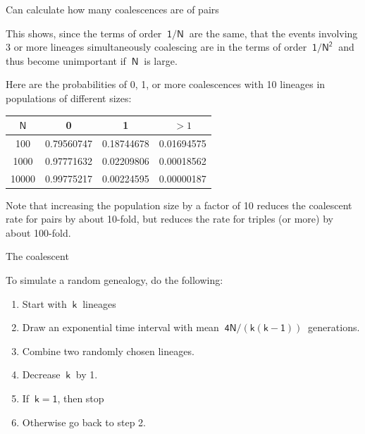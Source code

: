 \documentclass[bluish,slideColor,colorBG,pdf]{prosper}
\begin{document}
\begin{slide}[Replace]{Can calculate how many coalescences are of pairs}
\bigskip

This shows, since the terms of order $\mathsf{~1/N~}$ are the same,
that the events involving 3 or more lineages simultaneously
coalescing are in the terms of order $~\mathsf{1/N^2}~$ and thus become unimportant
if $~\mathsf{N}~$ is large.
\bigskip

Here are the probabilities of 0, 1, or more coalescences with 10 lineages
in populations of different sizes:
\bigskip

\begin{center}
\begin{tabular}{c | c c c}
$\mathsf{N}$ & 0 & 1 & $>1$\\
\hline
\raisebox{3pt}{\strut}100 &  0.79560747  & 0.18744678  &  0.01694575\\
1000 &  0.97771632  &   0.02209806  &   0.00018562\\
10000 & 0.99775217  &  0.00224595  & 0.00000187\\
\end{tabular}
\end{center}
\bigskip

Note that increasing the population size by a factor of 10 reduces the
coalescent rate for pairs by about 10-fold, but reduces the rate for
triples (or more) by about 100-fold.

\end{slide}

\begin{slide}[Replace]{The coalescent}

To simulate a random genealogy, do the following:
\begin{enumerate}
\item Start with $~\mathsf{k}~$ lineages
\item Draw an exponential time interval with mean $\mathsf{~4N/(k(k-1))}~$ generations.
\item Combine two randomly chosen lineages.
\item Decrease $~\mathsf{k}~$ by 1.
\item If $\mathsf{~k = 1}$, then stop
\item Otherwise go back to step 2.
\end{enumerate}

\end{slide}
\end{document}
